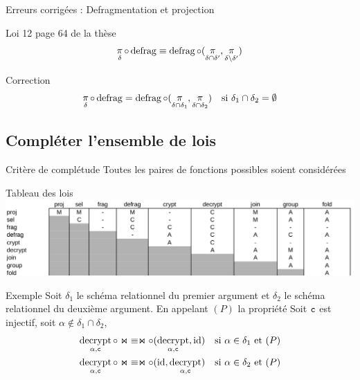 \documentclass{beamer}
\DeclareMathOperator{\proj}{\mathchar"1119}
\DeclareMathOperator{\defrag}{defrag}
\DeclareMathOperator{\decrypt}{decrypt}
\DeclareMathOperator{\id}{id}
\newcommand\typeT[1]{\text{\ttfamily #1}}
\newcommand{\decryptArgs}[2]{\decrypt_{#1 , \typeT{#2}}}
\newcommand{\projDelta}{\proj_{\delta}}
\newcommand{\decryptCAlpha}{\decryptArgs{\alpha}{c}}
\newcommand{\ch}{\typeT{c}}
\begin{document}
\begin{frame}{Erreurs corrigées : Defragmentation et projection}
\begin{block}{Loi 12 page 64 de la thèse}
$$
\projDelta \circ \defrag
\equiv \defrag \circ (\proj_{\delta \cap \delta'} , \proj_{\delta \setminus \delta'})
$$
\end{block}
\begin{exampleblock}{Correction}
\begin{align*}
\projDelta \circ \defrag
& = \defrag \circ (\proj_{\delta \cap \delta_1}, \proj_{\delta \cap \delta_2})
& \text{si $\delta_1 \cap \delta_2 = \emptyset$}
\end{align*}
\end{exampleblock}
\end{frame}

\subsection{Compléter l'ensemble de lois}

\begin{frame}{Critère de complétude}
Toutes les paires de fonctions possibles soient considérées
\end{frame}

\begin{frame}{Tableau des lois}
\includegraphics[width=\textwidth]{complLoisBilan.png}
\end{frame}

\begin{frame}{Exemple}
Soit $\delta_1$ le schéma relationnel du premier
	argument et $\delta_2$ le schéma relationnel du deuxième
	argument.
En appelant $(P)$ la propriété
\og Soit $\ch$ est injectif, soit $\alpha \notin \delta_1 \cap \delta_2$\fg{},
\begin{align}
\decryptCAlpha \circ \Join
& \equiv
\Join \circ (\decryptCAlpha, \id)
& \text{si $\alpha \in \delta_1$ et $(P)$} \\
\decryptCAlpha \circ \Join
& \equiv
\Join \circ (\id, \decryptCAlpha)
& \text{si $\alpha \in \delta_2$ et $(P)$} 
\end{align}
\end{frame}
\end{document}
